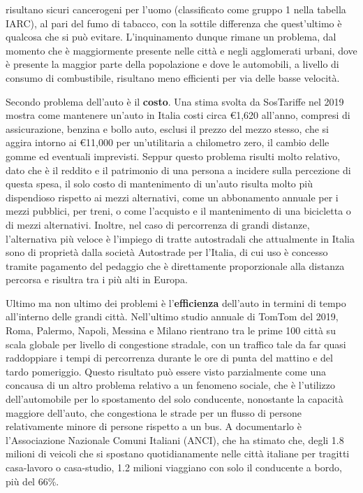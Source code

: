 risultano sicuri cancerogeni per l'uomo (classificato come gruppo 1 nella tabella IARC), al pari del fumo di tabacco, con la sottile differenza che quest'ultimo è qualcosa che si può evitare\cite{iarctable}. L'inquinamento dunque rimane un problema, dal momento che è maggiormente presente nelle città e negli agglomerati urbani, dove è presente la maggior parte della popolazione e dove le automobili, a livello di consumo di combustibile, risultano meno efficienti per via delle basse velocità.

Secondo problema dell'auto è il \textbf{costo}. Una stima svolta da SosTariffe nel 2019 mostra come mantenere un'auto in Italia costi circa €1,620 all'anno, compresi di assicurazione, benzina e bollo auto, esclusi il prezzo del mezzo stesso, che si aggira intorno ai €11,000 per un'utilitaria a chilometro zero, il cambio delle gomme ed eventuali imprevisti\cite{sostariffe}. Seppur questo problema risulti molto relativo, dato che è il reddito e il patrimonio di una persona a incidere sulla percezione di questa spesa, il solo costo di mantenimento di un'auto risulta molto più dispendioso rispetto ai mezzi alternativi, come un abbonamento annuale per i mezzi pubblici, per treni, o come l'acquisto e il mantenimento di una bicicletta o di mezzi alternativi. Inoltre, nel caso di percorrenza di grandi distanze, l'alternativa più veloce è l'impiego di tratte autostradali che attualmente in Italia sono di proprietà dalla società Autostrade per l'Italia, di cui uso è concesso tramite pagamento del pedaggio che è direttamente proporzionale alla distanza percorsa e risultra tra i più alti in Europa.

Ultimo ma non ultimo dei problemi è l'\textbf{efficienza} dell'auto in termini di tempo all'interno delle grandi città. Nell'ultimo studio annuale di TomTom del 2019\cite{tomtomindexmilan}, Roma, Palermo, Napoli, Messina e Milano rientrano tra le prime 100 città su scala globale per livello di congestione stradale, con un traffico tale da far quasi raddoppiare i tempi di percorrenza durante le ore di punta del mattino e del tardo pomeriggio. Questo risultato può essere visto parzialmente come una concausa di un altro problema relativo a un fenomeno sociale, che è l'utilizzo dell'automobile per lo spostamento del solo conducente, nonostante la capacità maggiore dell'auto, che congestiona le strade per un flusso di persone relativamente minore di persone rispetto a un bus. A documentarlo è l'Associazione Nazionale Comuni Italiani (ANCI), che ha stimato che, degli 1.8 milioni di veicoli che si spostano quotidianamente nelle città italiane per tragitti casa-lavoro o casa-studio, 1.2 milioni viaggiano con solo il conducente a bordo\cite{anciperrepubblica}, più del 66\%.

